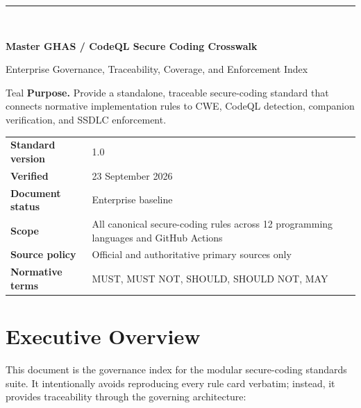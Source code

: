 \documentclass[10pt,letterpaper]{article}
\begin{document}
\fancyhead[L]{\textcolor{Muted}{Master GHAS / CodeQL Secure Coding Crosswalk}}
\fancyhead[R]{\textcolor{Muted}{v1.0 --- 23 September 2026}}
\hypersetup{pageanchor=false}
\begin{titlepage}
\thispagestyle{empty}
\vspace*{0.85in}
{\color{Teal}\rule{1.2in}{3pt}}\\[0.32in]
{\Huge\bfseries\color{Navy}Master GHAS / CodeQL Secure Coding Crosswalk\par}
\vspace{0.18in}
{\Large\color{Teal}Enterprise Governance, Traceability, Coverage, and Enforcement Index\par}
\vspace{0.55in}
\begin{callout}{Teal}
\textbf{Purpose.} Provide a standalone, traceable secure-coding standard that connects normative implementation rules to CWE, CodeQL detection, companion verification, and SSDLC enforcement.
\end{callout}
\vfill
\begin{tabular}{@{}ll@{}}
\textbf{Standard version} & 1.0 \\
\textbf{Verified} & 23 September 2026 \\
\textbf{Document status} & Enterprise baseline \\
\textbf{Scope} & All canonical secure-coding rules across 12 programming languages and GitHub Actions \\
\textbf{Source policy} & Official and authoritative primary sources only \\
\textbf{Normative terms} & MUST, MUST NOT, SHOULD, SHOULD NOT, MAY \\
\end{tabular}
\vspace{0.55in}
\end{titlepage}
\hypersetup{pageanchor=true}
\tableofcontents
\clearpage
{}

\section{Executive Overview}
This document is the governance index for the modular secure-coding standards suite. It intentionally avoids reproducing every rule card verbatim; instead, it provides traceability through the governing architecture:
\end{document}
